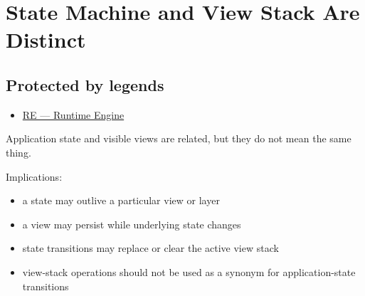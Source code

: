 \chapter{State Machine and View Stack Are Distinct}\label{record-059}

\smallskip

\section{Protected by legends}\label{record-059-protected-by-legends}

\begin{itemize}
\tightlist
\item
  \href{https://github.com/flyingrobots/bijou/blob/1853ad902f6bf219326409e7f743a5a1d6517dbc/docs/legends/RE-runtime-engine.md}{RE --- Runtime Engine}
\end{itemize}

Application state and visible views are related, but they do not mean the same thing.

Implications:

\begin{itemize}
\tightlist
\item
  a state may outlive a particular view or layer
\item
  a view may persist while underlying state changes
\item
  state transitions may replace or clear the active view stack
\item
  view-stack operations should not be used as a synonym for application-state transitions
\end{itemize}

